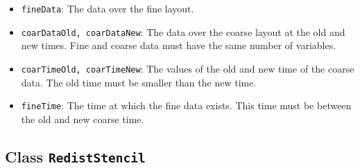 \begin{itemize}
\begin{itemize}
\item {\tt fineData}:  The data over the fine layout.
\item {\tt coarDataOld, coarDataNew}: The data over the coarse layout
        at the old and new times.  Fine and coarse data must
        have the same number of variables.
\item {\tt coarTimeOld, coarTimeNew}: The values of the old and new
       time of the coarse data.  The old time must be
       smaller than the new time.
\item {\tt fineTime}: The time at which the fine data exists.  This
        time must be between the old and new coarse time.
\end{itemize}
\end{itemize}

\subsection{Class {\tt RedistStencil}}

